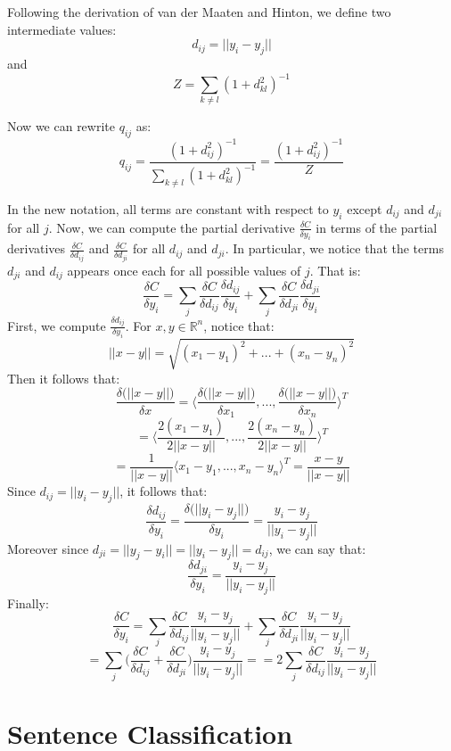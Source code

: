 \documentclass[a4paper]{article}
\begin{document}
\begin{enumerate}
{Following the derivation of van der Maaten and Hinton, we define two intermediate values:
$$d_{ij} = ||y_i - y_j || $$
and 
$$Z = \sum_{k \neq l} (1 + d_{kl}^2)^{-1} $$

Now we can rewrite $q_{ij}$ as:
$$q_{ij} = \frac{(1+d_{ij}^2)^{-1} }{ \sum_{k \neq l} (1 + d_{kl}^2)^{-1} } = \frac{(1+d_{ij}^2)^{-1} }{  Z }$$

In the new notation, all terms are constant with respect to $y_i$ except $d_{ij}$ and $d_{ji}$ for all $j$. Now, we can compute the partial derivative $\frac{\delta C }{\delta y_i}$ in terms of the partial derivatives $\frac{\delta C }{\delta d_{ij}}$ and $\frac{\delta C }{\delta d_{ji}}$ for all $d_{ij}$ and $d_{ji}$. In particular, we notice that the terms $d_{ji}$ and $d_{ij}$ appears once each for all possible values of $j$. That is:
$$\frac{\delta C }{\delta y_i} = \sum_j  \frac{\delta C }{\delta d_{ij}} \frac{\delta d_{ij} }{\delta y_{i}} + \sum_j  \frac{\delta C }{\delta d_{ji}} \frac{\delta d_{ji} }{\delta y_{i}} $$
First, we compute $\frac{\delta d_{ij} }{\delta y_{i}}$. For $x,y \in \mathbb{R}^n$, notice that:
$$ ||x - y || =  \sqrt{ (x_{1}-y_{1})^2 + ... + (x_{n}-y_{n})^2  } $$
Then it follows that:
$$\frac{\delta \Big( ||x - y || \Big) }{\delta x} = \Big \langle \frac{\delta \Big( ||x - y || \Big) }{\delta x_1}, ..., \frac{\delta \Big( ||x - y || \Big) }{\delta x_n} \Big \rangle^T $$
$$ = \Big \langle \frac{2(x_1 - y_1) }{ 2 ||x-y|| }, ..., \frac{ 2(x_n - y_n)}{ 2 ||x-y|| } \Big \rangle^T $$
$$ = \frac{1}{||x-y||}\Big \langle x_1-y_1, ..., x_n - y_n \Big \rangle ^T = \frac{x-y}{||x-y||} $$
Since $d_{ij} = ||y_i - y_j || $, it follows that:
$$\frac{\delta d_{ij}  }{\delta y_i} = \frac{\delta \Big( ||y_i - y_j || \Big) }{\delta y_i} = \frac{y_i - y_j}{ ||y_i - y_j ||} $$
Moreover since $d_{ji} = ||y_j - y_i || = ||y_i - y_j ||  = d_{ij} $, we can say that: 
$$\frac{\delta d_{ji}  }{\delta y_i} = \frac{y_i - y_j}{ ||y_i - y_j ||} $$
Finally:
$$\frac{\delta C }{\delta y_i} = \sum_j  \frac{\delta C }{\delta d_{ij}} \frac{y_i - y_j}{ ||y_i - y_j ||} + \sum_j  \frac{\delta C }{\delta d_{ji}} \frac{y_i - y_j}{ ||y_i - y_j ||} $$
$$ =  \sum_j  \Big( \frac{\delta C }{\delta d_{ij}} +  \frac{\delta C }{\delta d_{ji}} \Big) \frac{y_i - y_j}{ ||y_i - y_j ||} =   =  2 \sum_j  \frac{\delta C }{\delta d_{ij}}  \frac{y_i - y_j}{ ||y_i - y_j ||} $$

}
\end{enumerate}

\section{Sentence Classification}
\end{document}
